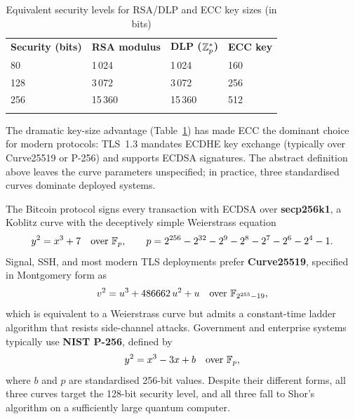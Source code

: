 \begin{table}[t]
\caption{Equivalent security levels for RSA/DLP and ECC key sizes (in bits)}
\label{tab:key-sizes}
\begin{tabular}{p{3cm}p{3cm}p{3cm}p{3cm}}
\hline\noalign{\smallskip}
\textbf{Security (bits)} & \textbf{RSA modulus} & \textbf{DLP ($\mathbb{Z}_p^*$)} & \textbf{ECC key} \\
\noalign{\smallskip}\svhline\noalign{\smallskip}
80  & 1\,024 & 1\,024 & 160 \\
128 & 3\,072 & 3\,072 & 256 \\
256 & 15\,360 & 15\,360 & 512 \\
\noalign{\smallskip}\hline
\end{tabular}
\end{table}

The dramatic key-size advantage (Table~\ref{tab:key-sizes}) has made ECC the dominant choice for modern protocols: TLS~1.3 mandates ECDHE key exchange (typically over Curve25519 or P-256) and supports ECDSA signatures.  The abstract definition above leaves the curve parameters unspecified; in practice, three standardised curves dominate deployed systems.

\begin{example}
\label{ex:famous-curves}
The Bitcoin protocol signs every transaction with ECDSA over \textbf{secp256k1}, a Koblitz curve with the deceptively simple Weierstrass equation
\begin{equation}
y^2 = x^3 + 7 \quad \text{over } \mathbb{F}_p, \qquad p = 2^{256} - 2^{32} - 2^9 - 2^8 - 2^7 - 2^6 - 2^4 - 1.
\end{equation}
Signal, SSH, and most modern TLS deployments prefer \textbf{Curve25519}, specified in Montgomery form as
\begin{equation}
v^2 = u^3 + 486662\,u^2 + u \quad \text{over } \mathbb{F}_{2^{255} - 19},
\end{equation}
which is equivalent to a Weierstrass curve but admits a constant-time ladder algorithm that resists side-channel attacks.  Government and enterprise systems typically use \textbf{NIST P-256}, defined by
\begin{equation}
y^2 = x^3 - 3x + b \quad \text{over } \mathbb{F}_p,
\end{equation}
where $b$ and $p$ are standardised 256-bit values.  Despite their different forms, all three curves target the 128-bit security level, and all three fall to Shor's algorithm on a sufficiently large quantum computer.
\end{example}

